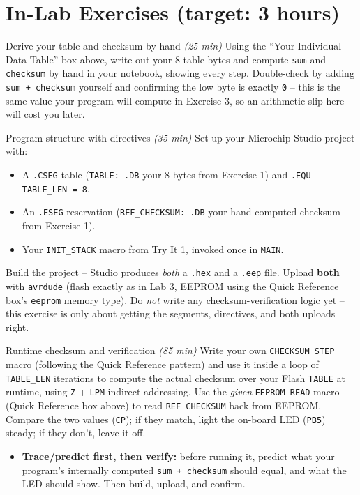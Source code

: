 \documentclass[11pt]{article}
\begin{document}
\section*{In-Lab Exercises (target: 3 hours)}

\begin{labexercise}{Derive your table and checksum by hand \hfill {\small \itshape (25 min)}}
Using the ``Your Individual Data Table'' box above, write out your 8 table bytes
and compute \texttt{sum} and \texttt{checksum} by hand in your notebook, showing
every step. Double-check by adding \texttt{sum + checksum} yourself and confirming
the low byte is exactly \texttt{0} -- this is the same value your program will
compute in Exercise 3, so an arithmetic slip here will cost you later.
\end{labexercise}

\begin{labexercise}{Program structure with directives \hfill {\small \itshape (35 min)}}
Set up your Microchip Studio project with:
\begin{itemize}[nosep,leftmargin=*]
  \item A \texttt{.CSEG} table (\texttt{TABLE: .DB} your 8 bytes from Exercise 1)
        and \texttt{.EQU TABLE\_LEN = 8}.
  \item An \texttt{.ESEG} reservation (\texttt{REF\_CHECKSUM: .DB} your
        hand-computed checksum from Exercise 1).
  \item Your \texttt{INIT\_STACK} macro from Try It 1, invoked once in
        \texttt{MAIN}.
\end{itemize}
Build the project -- Studio produces \emph{both} a \texttt{.hex} and a
\texttt{.eep} file. Upload \textbf{both} with \texttt{avrdude} (flash exactly as
in Lab 3, EEPROM using the Quick Reference box's \texttt{eeprom} memory type). Do
\emph{not} write any checksum-verification logic yet -- this exercise is only
about getting the segments, directives, and both uploads right.
\end{labexercise}

\begin{labexercise}{Runtime checksum and verification \hfill {\small \itshape (85 min)}}
Write your own \texttt{CHECKSUM\_STEP} macro (following the Quick Reference
pattern) and use it inside a loop of \texttt{TABLE\_LEN} iterations to compute the
actual checksum over your Flash \texttt{TABLE} at runtime, using \texttt{Z} +
\texttt{LPM} indirect addressing. Use the \emph{given} \texttt{EEPROM\_READ}
macro (Quick Reference box above) to read \texttt{REF\_CHECKSUM} back from
EEPROM. Compare the two values (\texttt{CP}); if they match, light the on-board
LED (\texttt{PB5}) steady; if they don't, leave it off.
\begin{itemize}[nosep,leftmargin=*]
  \item \textbf{Trace/predict first, then verify:} before running it, predict
        what your program's internally computed \texttt{sum + checksum} should
        equal, and what the LED should show. Then build, upload, and confirm.
\end{itemize}
\end{labexercise}
\end{document}
